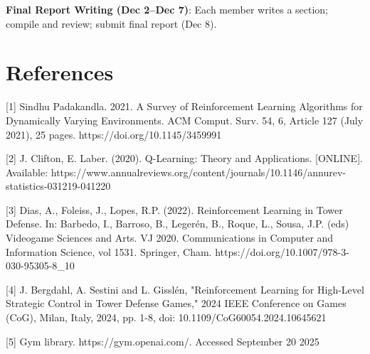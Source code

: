 \documentclass[12pt]{article}
\begin{document}
\textbf{Final Report Writing (Dec 2--Dec 7)}: Each member writes a section; compile and review; submit final report (Dec 8).


\vspace{0.5em}

\section*{References}

[1] Sindhu Padakandla. 2021. A Survey of Reinforcement Learning Algorithms for Dynamically Varying Environments. ACM Comput. Surv. 54, 6, Article 127 (July 2021), 25 pages.
https://doi.org/10.1145/3459991 \par

[2] J. Clifton, E. Laber. (2020). Q-Learning: Theory and Applications. [ONLINE]. Available: https://www.annualreviews.org/content/journals/10.1146/annurev-statistics-031219-041220 \par

[3] Dias, A., Foleiss, J., Lopes, R.P. (2022). Reinforcement Learning in Tower Defense. In: Barbedo, I., Barroso, B., Legerén, B., Roque, L., Sousa, J.P. (eds) Videogame Sciences and Arts. VJ 2020. Communications in Computer and Information Science, vol 1531. Springer, Cham. https://doi.org/10.1007/978-3-030-95305-8\_10 \par 

[4] J. Bergdahl, A. Sestini and L. Gisslén, "Reinforcement Learning for High-Level Strategic Control in Tower Defense Games," 2024 IEEE Conference on Games (CoG), Milan, Italy, 2024, pp. 1-8, doi: 10.1109/CoG60054.2024.10645621 \par

[5] Gym library. https://gym.openai.com/. Accessed September 20 2025
\end{document}

